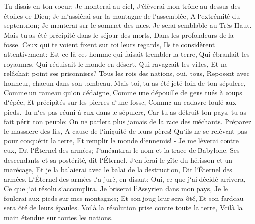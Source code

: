 \verse Tu disais en ton coeur: Je monterai au ciel, J`élèverai mon trône au-dessus des étoiles de Dieu; Je m`assiérai sur la montagne de l`assemblée, A l`extrémité du septentrion; 
\verse Je monterai sur le sommet des nues, Je serai semblable au Très Haut. 
\verse Mais tu as été précipité dans le séjour des morts, Dans les profondeurs de la fosse. 
\verse Ceux qui te voient fixent sur toi leurs regards, Ils te considèrent attentivement: Est-ce là cet homme qui faisait trembler la terre, Qui ébranlait les royaumes, 
\verse Qui réduisait le monde en désert, Qui ravageait les villes, Et ne relâchait point ses prisonniers? 
\verse Tous les rois des nations, oui, tous, Reposent avec honneur, chacun dans son tombeau. 
\verse Mais toi, tu as été jeté loin de ton sépulcre, Comme un rameau qu`on dédaigne, Comme une dépouille de gens tués à coups d`épée, Et précipités sur les pierres d`une fosse, Comme un cadavre foulé aux pieds. 
\verse Tu n`es pas réuni à eux dans le sépulcre, Car tu as détruit ton pays, tu as fait périr ton peuple: On ne parlera plus jamais de la race des méchants. 
\verse Préparez le massacre des fils, A cause de l`iniquité de leurs pères! Qu`ils ne se relèvent pas pour conquérir la terre, Et remplir le monde d`ennemis! - 
\verse Je me lèverai contre eux, Dit l`Éternel des armées; J`anéantirai le nom et la trace de Babylone, Ses descendants et sa postérité, dit l`Éternel. 
\verse J`en ferai le gîte du hérisson et un marécage, Et je la balaierai avec le balai de la destruction, Dit l`Éternel des armées. 
\verse L`Éternel des armées l`a juré, en disant: Oui, ce que j`ai décidé arrivera, Ce que j`ai résolu s`accomplira. 
\verse Je briserai l`Assyrien dans mon pays, Je le foulerai aux pieds sur mes montagnes; Et son joug leur sera ôté, Et son fardeau sera ôté de leurs épaules. 
\verse Voilà la résolution prise contre toute la terre, Voilà la main étendue sur toutes les nations. 
